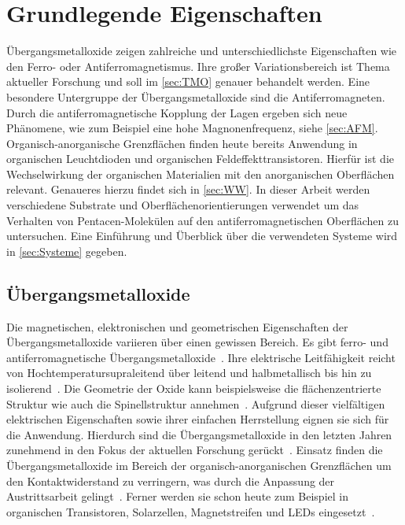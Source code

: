 \chapter{Grundlegende Eigenschaften}
    Übergangsmetalloxide zeigen zahlreiche und unterschiedlichste Eigenschaften wie den Ferro- oder Antiferromagnetismus.
    Ihre großer Variationsbereich ist Thema aktueller Forschung und soll im \autoref{sec:TMO} genauer behandelt werden.
    Eine besondere Untergruppe der Übergangsmetalloxide sind die Antiferromagneten.
    Durch die antiferromagnetische Kopplung der Lagen ergeben sich neue Phänomene, wie zum Beispiel eine hohe Magnonenfrequenz, siehe \autoref{sec:AFM}.
    Organisch-anorganische Grenzflächen finden heute bereits Anwendung in organischen Leuchtdioden und organischen Feldeffekttransistoren.
    Hierfür ist die Wechselwirkung der organischen Materialien mit den anorganischen Oberflächen relevant.
    Genaueres hierzu findet sich in \autoref{sec:WW}.
    In dieser Arbeit werden verschiedene Substrate und Oberflächenorientierungen verwendet um das Verhalten von Pentacen-Molekülen auf den antiferromagnetischen Oberflächen zu untersuchen.
    Eine Einführung und Überblick über die verwendeten Systeme wird in \autoref{sec:Systeme} gegeben.

    \section{Übergangsmetalloxide} \label{sec:TMO}
        Die magnetischen, elektronischen und geometrischen Eigenschaften der Übergangsmetalloxide variieren über einen gewissen Bereich.
        Es gibt ferro- und antiferromagnetische Übergangsmetalloxide~\cite{IF_5}.
        Ihre elektrische Leitfähigkeit reicht von Hochtemperatursupraleitend über leitend und halbmetallisch bis hin zu isolierend~\cite{IF_5}.
        Die Geometrie der Oxide kann beispielsweise die flächenzentrierte Struktur wie auch die Spinellstruktur annehmen~\cite{FeO_26}.
        Aufgrund dieser vielfältigen elektrischen Eigenschaften sowie ihrer einfachen Herrstellung eignen sie sich für die Anwendung.        
        Hierdurch sind die Übergangsmetalloxide in den letzten Jahren zunehmend in den Fokus der aktuellen Forschung gerückt~\cite{IF_6, parkinson_iron_2016, cornell_iron_2003}.
        Einsatz finden die Übergangsmetalloxide im Bereich der organisch-anorganischen Grenzflächen um den Kontaktwiderstand zu verringern, was durch die Anpassung der Austrittsarbeit gelingt~\cite{IF_11, NiO_40}.
        Ferner werden sie schon heute zum Beispiel in organischen Transistoren, Solarzellen, Magnetstreifen und LEDs eingesetzt~\cite{IF_3}.

